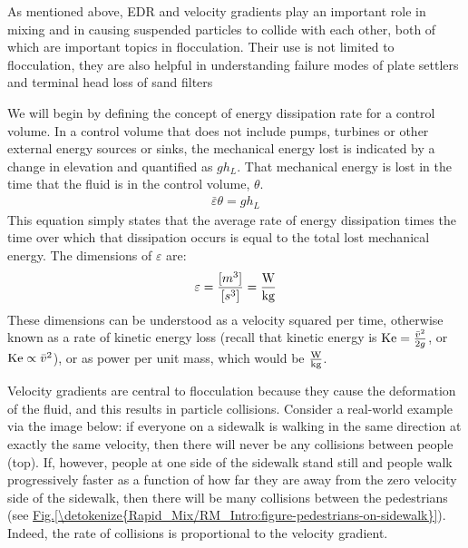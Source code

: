 \documentclass[letterpaper,10pt,english]{sphinxmanual}
\begin{document}
As mentioned above, EDR and velocity gradients play an important role in mixing and in causing suspended particles to collide with each other, both of which are important topics in flocculation. Their use is not limited to flocculation, they are also helpful in understanding failure modes of plate settlers and terminal head loss of sand filters

We will begin by defining the concept of energy dissipation rate for a control volume. In a control volume that does not include pumps, turbines or other external energy sources or sinks, the mechanical energy lost is indicated by a change in elevation and quantified as \(g h_L\). That mechanical energy is lost in the time that the fluid is in the control volume, \(\theta\).
\begin{equation}\label{equation:Rapid_Mix/RM_Intro:Rapid_Mix/RM_Intro:4}
\begin{split}\bar\varepsilon \theta = g h_L\end{split}
\end{equation}
This equation simply states that the average rate of energy dissipation times the time over which that dissipation occurs is equal to the total lost mechanical energy. The dimensions of \(\varepsilon\) are:
\begin{equation}\label{equation:Rapid_Mix/RM_Intro:Rapid_Mix/RM_Intro:5}
\begin{split}\varepsilon = \frac{[m^3]}{[s^3]} = {\rm \frac{W}{kg}}\end{split}
\end{equation}
These dimensions can be understood as a velocity squared per time, otherwise known as a rate of kinetic energy loss (recall that kinetic energy is \({\rm Ke} = \frac{\bar v^2}{2g}\), or \({\rm Ke} \propto \bar v^2\)), or as power per unit mass, which would be \({\rm  \frac{W}{kg}}\).

Velocity gradients are central to flocculation because they cause the deformation of the fluid, and this results in particle collisions. Consider a real-world example via the image below: if everyone on a sidewalk is walking in the same direction at exactly the same velocity, then there will never be any collisions between people (top). If, however, people at one side of the sidewalk stand still and people walk progressively faster as a function of how far they are away from the zero velocity side of the sidewalk, then there will be many collisions between the pedestrians (see \hyperref[\detokenize{Rapid_Mix/RM_Intro:figure-pedestrians-on-sidewalk}]{Fig.\@ \ref{\detokenize{Rapid_Mix/RM_Intro:figure-pedestrians-on-sidewalk}}}). Indeed, the rate of collisions is proportional to the velocity gradient.
\end{document}
